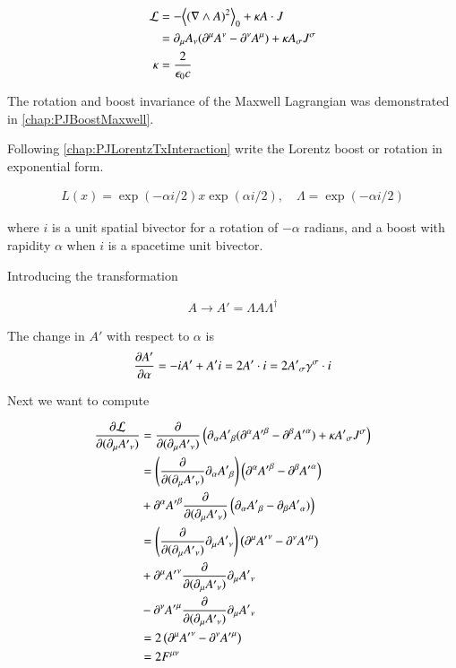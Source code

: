 \begin{align}\label{eqn:noetherField:lagrangian}
\mathcal{L} 
&= -{\left\langle{{(\nabla\wedge A)^2}}\right\rangle}_{0} + \kappa A \cdot J \\
&= \partial_\mu A_\nu (\partial^\mu A^\nu - \partial^\nu A^\mu) + \kappa A_\sigma J^\sigma \\
\kappa &= \frac{2}{\epsilon_0 c}
\end{align}

The rotation and boost invariance of the Maxwell Lagrangian was demonstrated in 
\ref{chap:PJBoostMaxwell}.

Following 
\ref{chap:PJLorentzTxInteraction}
write the Lorentz boost or rotation in exponential form.

\begin{align*}
L(x) = \exp(-\alpha i/2) x \exp(\alpha i/2), \quad \Lambda = \exp(-\alpha i/2)
\end{align*}

where $i$ is a unit spatial bivector for a rotation of $-\alpha$ radians, and a boost with rapidity $\alpha$ when $i$ is a spacetime unit bivector.

Introducing the transformation

\begin{align*}
A \rightarrow A' = \Lambda A \Lambda^\dagger
\end{align*}

The change in $A'$ with respect to $\alpha$ is
\begin{align*}
\frac{\partial {A'}}{\partial {\alpha}} = -i A' + A' i = 2 A' \cdot i = 2 {A'}_\sigma \gamma^\sigma \cdot i
\end{align*}

Next we want to compute

\begin{align*}
\frac{\partial {\mathcal{L}}}{\partial {(\partial_\mu {A'}_\nu)}} 
&= \frac{\partial {}}{\partial {(\partial_\mu {A'}_\nu)}} \left( \partial_\alpha {A'}_\beta (\partial^\alpha {A'}^\beta - \partial^\beta {A'}^\alpha) + \kappa {A'}_\sigma J^\sigma \right) \\
&= \left( \frac{\partial {}}{\partial {(\partial_\mu {A'}_\nu)}} \partial_\alpha {A'}_\beta \right) \left(\partial^\alpha {A'}^\beta - \partial^\beta {A'}^\alpha \right) \\
&+ \partial^\alpha {A'}^\beta \frac{\partial {}}{\partial {(\partial_\mu {A'}_\nu)}} \left(\partial_\alpha {A'}_\beta - \partial_\beta {A'}_\alpha) \right) \\
&= \left( \frac{\partial {}}{\partial {(\partial_\mu {A'}_\nu)}} \partial_\mu {A'}_\nu \right) \left(\partial^\mu {A'}^\nu - \partial^\nu {A'}^\mu \right) \\
&+ \partial^\mu {A'}^\nu \frac{\partial {}}{\partial {(\partial_\mu {A'}_\nu)}} \partial_\mu {A'}_\nu \\
&- \partial^\nu {A'}^\mu \frac{\partial {}}{\partial {(\partial_\mu {A'}_\nu)}} \partial_\mu {A'}_\nu \\
&= 2 \left( \partial^\mu {A'}^\nu - \partial^\nu {A'}^\mu \right) \\
&= 2 F^{\mu\nu}
\end{align*}

